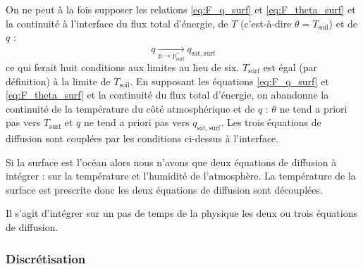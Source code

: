 \documentclass[a4paper,english,french]{article}
\begin{document}
On ne peut à la fois supposer les relations \ref{eq:F_q_surf} et
\ref{eq:F_theta_surf} et la continuité à l'interface du flux total
d'énergie, de $T$ (c'est-à-dire $\theta = T_\mathrm{soil}$) et de $q$ :
\begin{equation*}
  q \xrightarrow[p \to p_\mathrm{surf}^-]{} q_\mathrm{sat, surf}  
\end{equation*}
ce qui ferait huit conditions aux limites au lieu de
six. $T_\mathrm{surf}$ est égal (par définition) à la limite de
$T_\mathrm{soil}$. En supposant les équations \ref{eq:F_q_surf} et
\ref{eq:F_theta_surf} et la continuité du flux total d'énergie, on
abandonne la continuité de la température du côté atmosphérique et de
$q$ : $\theta$ ne tend a priori pas vers $T_\mathrm{surf}$ et $q$ ne
tend a priori pas vers $q_\mathrm{sat, surf}$. Les trois équations de
diffusion sont couplées par les conditions ci-dessus à l'interface.

Si la surface est l'océan alors nous n'avons que deux équations
de diffusion à intégrer : sur la température et l'humidité de
l'atmosphère. La température de la surface est prescrite donc les deux
équations de diffusion sont découplées.

Il s'agit d'intégrer sur un pas de temps de la physique les deux ou
trois équations de diffusion.

\subsubsection{Discrétisation}
\end{document}
